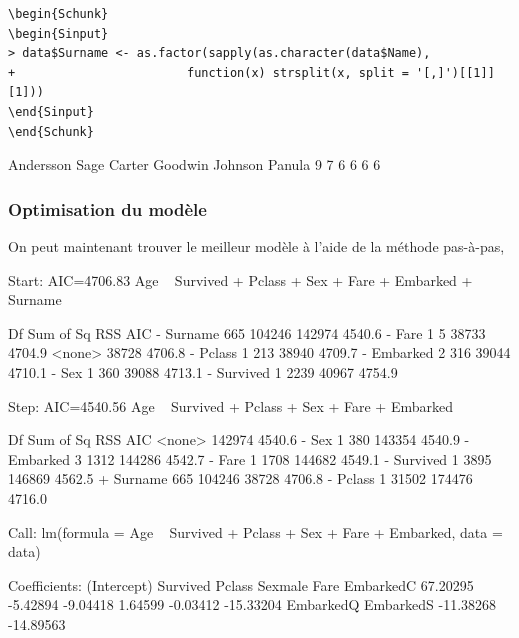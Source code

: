 \documentclass[11pt,french]{report}
\begin{document}
\begin{lstlisting}[linerange=\\begin\{Sinput\}-\\end\{Sinput\},includerangemarker=false]
\begin{Schunk}
\begin{Sinput}
> data$Surname <- as.factor(sapply(as.character(data$Name),  
+                        function(x) strsplit(x, split = '[,]')[[1]][1]))
\end{Sinput}
\end{Schunk}
\end{lstlisting}
\bigskip
\begin{Schunk}
\begin{Soutput}
Andersson      Sage    Carter   Goodwin   Johnson    Panula 
        9         7         6         6         6         6 
\end{Soutput}
\end{Schunk}

\subsubsection{Optimisation du modèle}
On peut maintenant trouver le meilleur modèle à l'aide de la méthode pas-à-pas,

\begin{Schunk}
\begin{Soutput}
Start:  AIC=4706.83
Age ~ Survived + Pclass + Sex + Fare + Embarked + Surname

            Df Sum of Sq    RSS    AIC
- Surname  665    104246 142974 4540.6
- Fare       1         5  38733 4704.9
<none>                    38728 4706.8
- Pclass     1       213  38940 4709.7
- Embarked   2       316  39044 4710.1
- Sex        1       360  39088 4713.1
- Survived   1      2239  40967 4754.9

Step:  AIC=4540.56
Age ~ Survived + Pclass + Sex + Fare + Embarked

            Df Sum of Sq    RSS    AIC
<none>                   142974 4540.6
- Sex        1       380 143354 4540.9
- Embarked   3      1312 144286 4542.7
- Fare       1      1708 144682 4549.1
- Survived   1      3895 146869 4562.5
+ Surname  665    104246  38728 4706.8
- Pclass     1     31502 174476 4716.0
\end{Soutput}
\begin{Soutput}
Call:
lm(formula = Age ~ Survived + Pclass + Sex + Fare + Embarked, 
    data = data)

Coefficients:
(Intercept)     Survived       Pclass      Sexmale         Fare    EmbarkedC  
   67.20295     -5.42894     -9.04418      1.64599     -0.03412    -15.33204  
  EmbarkedQ    EmbarkedS  
  -11.38268    -14.89563  
\end{Soutput}
\end{Schunk}
\end{document}
